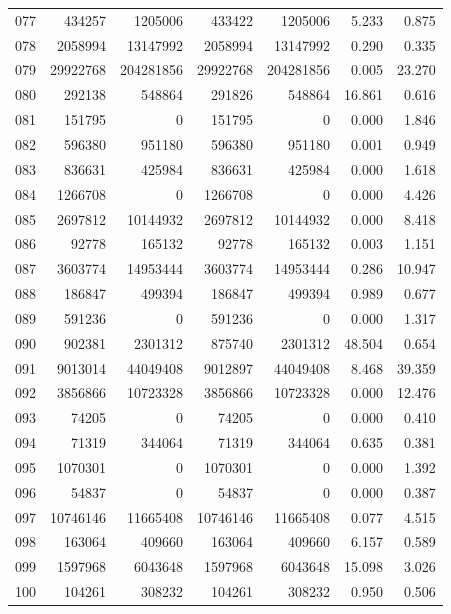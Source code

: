 \begin{longtable}{lrrrrrr}
077 & 434257 & 1205006 & 433422 & 1205006 & 5.233 & 0.875\\
078 & 2058994 & 13147992 & 2058994 & 13147992 & 0.290 & 0.335\\
079 & 29922768 & 204281856 & 29922768 & 204281856 & 0.005 & 23.270\\
080 & 292138 & 548864 & 291826 & 548864 & 16.861 & 0.616\\
081 & 151795 & 0 & 151795 & 0 & 0.000 & 1.846\\
082 & 596380 & 951180 & 596380 & 951180 & 0.001 & 0.949\\
083 & 836631 & 425984 & 836631 & 425984 & 0.000 & 1.618\\
084 & 1266708 & 0 & 1266708 & 0 & 0.000 & 4.426\\
085 & 2697812 & 10144932 & 2697812 & 10144932 & 0.000 & 8.418\\
086 & 92778 & 165132 & 92778 & 165132 & 0.003 & 1.151\\
087 & 3603774 & 14953444 & 3603774 & 14953444 & 0.286 & 10.947\\
088 & 186847 & 499394 & 186847 & 499394 & 0.989 & 0.677\\
089 & 591236 & 0 & 591236 & 0 & 0.000 & 1.317\\
090 & 902381 & 2301312 & 875740 & 2301312 & 48.504 & 0.654\\
091 & 9013014 & 44049408 & 9012897 & 44049408 & 8.468 & 39.359\\
092 & 3856866 & 10723328 & 3856866 & 10723328 & 0.000 & 12.476\\
093 & 74205 & 0 & 74205 & 0 & 0.000 & 0.410\\
094 & 71319 & 344064 & 71319 & 344064 & 0.635 & 0.381\\
095 & 1070301 & 0 & 1070301 & 0 & 0.000 & 1.392\\
096 & 54837 & 0 & 54837 & 0 & 0.000 & 0.387\\
097 & 10746146 & 11665408 & 10746146 & 11665408 & 0.077 & 4.515\\
098 & 163064 & 409660 & 163064 & 409660 & 6.157 & 0.589\\
099 & 1597968 & 6043648 & 1597968 & 6043648 & 15.098 & 3.026\\
100 & 104261 & 308232 & 104261 & 308232 & 0.950 & 0.506\\
\end{longtable}

